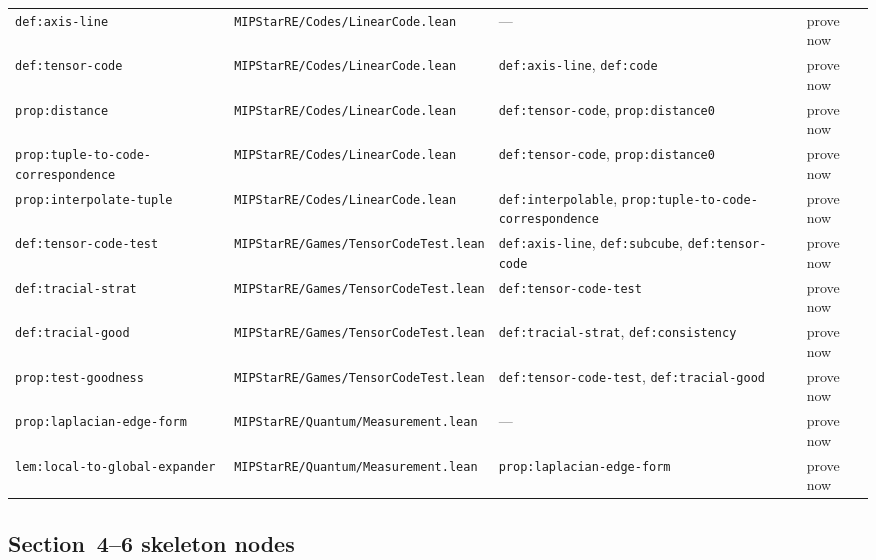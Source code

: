 \documentclass{article}
\theoremstyle{remark}
\begin{document}
\begin{longtable}{L{0.16\textwidth}L{0.27\textwidth}L{0.33\textwidth}L{0.14\textwidth}}
\texttt{def:axis-line} & \texttt{MIPStarRE/Codes/LinearCode.lean} & --- & prove now \\
\texttt{def:tensor-code} & \texttt{MIPStarRE/Codes/LinearCode.lean} & \texttt{def:axis-line}, \texttt{def:code} & prove now \\
\texttt{prop:distance} & \texttt{MIPStarRE/Codes/LinearCode.lean} & \texttt{def:tensor-code}, \texttt{prop:distance0} & prove now \\
\texttt{prop:tuple-to-code-correspondence} & \texttt{MIPStarRE/Codes/LinearCode.lean} & \texttt{def:tensor-code}, \texttt{prop:distance0} & prove now \\
\texttt{prop:interpolate-tuple} & \texttt{MIPStarRE/Codes/LinearCode.lean} & \texttt{def:interpolable}, \texttt{prop:tuple-to-code-correspondence} & prove now \\
\texttt{def:tensor-code-test} & \texttt{MIPStarRE/Games/TensorCodeTest.lean} & \texttt{def:axis-line}, \texttt{def:subcube}, \texttt{def:tensor-code} & prove now \\
\texttt{def:tracial-strat} & \texttt{MIPStarRE/Games/TensorCodeTest.lean} & \texttt{def:tensor-code-test} & prove now \\
\texttt{def:tracial-good} & \texttt{MIPStarRE/Games/TensorCodeTest.lean} & \texttt{def:tracial-strat}, \texttt{def:consistency} & prove now \\
\texttt{prop:test-goodness} & \texttt{MIPStarRE/Games/TensorCodeTest.lean} & \texttt{def:tensor-code-test}, \texttt{def:tracial-good} & prove now \\
\texttt{prop:laplacian-edge-form} & \texttt{MIPStarRE/Quantum/Measurement.lean} & --- & prove now \\
\texttt{lem:local-to-global-expander} & \texttt{MIPStarRE/Quantum/Measurement.lean} & \texttt{prop:laplacian-edge-form} & prove now \\
\bottomrule
\end{longtable}
\normalsize

\subsection{Section~4--6 skeleton nodes}
\end{document}
